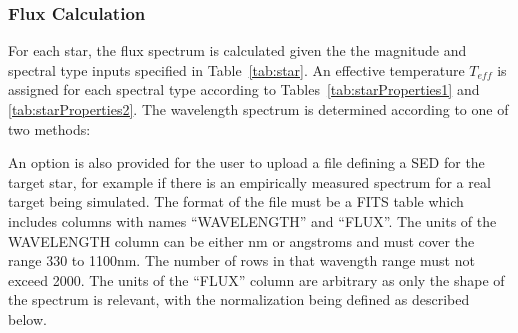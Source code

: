 \documentclass[11pt]{article}      %
\makeatletter
\def\HCode#1{}
\def\htmlanchor#1{\HCode{<a id="#1"></a>}}
\renewcommand{\href}[2]{\bgroup\let~\H@tilde%
  \Link[#1 target="_blank"]{}{}%
  {#2}\egroup\EndLink}%
\makeatother
\begin{document}
\clearpage 
\htmlanchor{SEDs}
\subsubsection{Flux Calculation}
\label{sec:flux}

For each star, the flux spectrum is calculated given the the magnitude and spectral type inputs specified in Table~\ref{tab:star}.  An effective temperature $T_{eff}$ is assigned for each spectral type according to Tables~\ref{tab:starProperties1} and \ref{tab:starProperties2}.  The wavelength spectrum is determined according to one of two methods:
\htmlanchor{userSED}
An option is also provided for the user to upload a file defining a SED for the target star, for example if there is an empirically measured spectrum for a real target being simulated. The format of the file must be a FITS table which includes columns with names ``WAVELENGTH'' and ``FLUX''. The units of the WAVELENGTH column can be either nm or angstroms and must cover the range 330 to 1100nm. The number of rows in that wavength range must not exceed 2000. The units of the ``FLUX'' column are arbitrary as only the shape of the spectrum is relevant, with the normalization being defined as described below.
\end{document}

